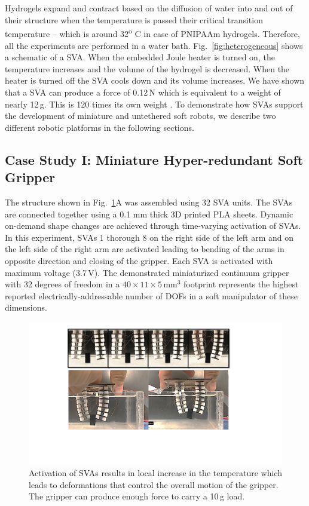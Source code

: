 \section{}
Hydrogels expand and contract based on the diffusion of water into and out of their structure when the temperature is passed their critical transition temperature -- which is around 32\textsuperscript{o} C in case of PNIPAAm hydrogels. Therefore, all the experiments are performed in a water bath. Fig.~\ref{fig:heterogeneous} shows a schematic of a SVA. When the embedded Joule heater is turned on, the temperature increases and the volume of the hydrogel is decreased. When the heater is turned off the SVA cools down and its volume increases. We have shown that a SVA can produce a force of 0.12\,N which is equivalent to a weight of nearly 12\,g. This is 120 times its own weight \cite{Khodambashi2021}. To demonstrate how SVAs support the development of miniature and untethered soft robots, we describe two different robotic platforms in the following sections. 

\subsection{Case Study I: Miniature Hyper-redundant Soft Gripper}
The structure shown in Fig.~\ref{fig:gripper}A was assembled using 32 SVA units. The SVAs are connected together using a 0.1 mm thick 3D printed PLA sheets. Dynamic on-demand shape changes are achieved through time-varying activation of SVAs. In this experiment, SVAs 1 thorough 8 on the right side of the left arm and on the left side of the right arm are activated leading to bending of the arms in opposite direction and closing of the gripper.
Each SVA is activated with maximum voltage (3.7\,V). The demonstrated miniaturized continuum gripper with 32 degrees of freedom in a $40\times11\times5$\,mm$^3$ footprint represents the highest reported electrically-addressable number of DOFs in a soft manipulator of these dimensions. 
\begin{figure}[!ht]
      \centering
      \includegraphics[width=\textwidth]{gripper.pdf}
      \caption[]{Activation of SVAs results in local increase in the temperature which leads to deformations that control the overall motion of the gripper. The gripper can produce enough force to carry a 10\,g load. }
      \label{fig:gripper}
\end{figure}

